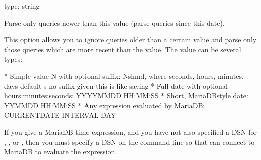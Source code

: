 \documentclass[letterpaper,10pt,english]{sphinxmanual}
\begin{document}

\begin{fulllineitems}
\label{\detokenize{mariadb-query-digest:cmdoption-mariadb-query-digest-since}}
type: string

Parse only queries newer than this value (parse queries since this date).

This option allows you to ignore queries older than a certain value and parse
only those queries which are more recent than the value.  The value can be
several types:

\begin{sphinxVerbatim}[commandchars=\\\{\}]
* Simple  value N with optional suffix: N\PYG{o}{[}shmd\PYG{o}{]}, where
  seconds, hours, minutes, days default s  no suffix
  given this is like saying 
* Full date with optional hours:minutes:seconds:
  YYYY\PYGZhy{}MM\PYGZhy{}DD \PYG{o}{[}HH:MM:SS\PYG{o}{]}
* Short, MariaDB\PYGZhy{}style date:
  YYMMDD \PYG{o}{[}HH:MM:SS\PYG{o}{]}
* Any  expression evaluated by MariaDB:
  CURRENT\PYGZus{}DATE \PYGZhy{} INTERVAL  DAY
\end{sphinxVerbatim}

If you give a MariaDB time expression, and you have not also specified a DSN
for {\hyperref[\detokenize{mariadb-query-digest:cmdoption-mariadb-query-digest-explain}]{}}, {\hyperref[\detokenize{mariadb-query-digest:cmdoption-mariadb-query-digest-processlist}]{}}, or {\hyperref[\detokenize{mariadb-query-digest:cmdoption-mariadb-query-digest-review}]{}}, then you must specify
a DSN on the command line so that  can connect to MariaDB to
evaluate the expression.


\end{fulllineitems}
\end{document}
